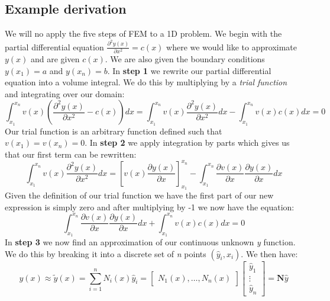 \subsection{Example derivation}
We will no apply the five steps of FEM to a 1D problem. We begin with the partial differential equation $\frac{\partial^2 y(x)}{\partial x^2} = c(x)$ where we would like to approximate $y(x)$ and are given $c(x)$. We are also given the boundary conditions $y(x_1) = a$ and $y(x_n) = b$. In \textbf{step 1} we rewrite our partial differential equation into a volume integral. We do this by multiplying by a \textit{trial function} and integrating over our domain:
\begin{equation*}
	\int_{x_1}^{x_n} v(x)\left(\frac{\partial^2 y(x)}{\partial x^2} - c(x)\right)dx = \int_{x_1}^{x_n} v(x)\frac{\partial^2 y(x)}{\partial x^2} dx - \int_{x_1}^{x_n} v(x)c(x) dx = 0
\end{equation*}
Our trial function is an arbitrary function defined such that $v(x_1) = v(x_n) = 0$. In \textbf{step 2} we apply integration by parts which gives us that our first term can be rewritten:
\begin{equation*}
	\int_{x_1}^{x_n} v(x)\frac{\partial^2 y(x)}{\partial x^2} dx = \left[v(x)\frac{\partial y(x)}{\partial x}\right]_{x_1}^{x_n} - \int_{x_1}^{x_n} \frac{\partial v(x)}{\partial x}\frac{\partial y(x)}{\partial x} dx
\end{equation*}
Given the definition of our trial function we have the first part of our new expression is simply zero and after multiplying by -1 we now have the equation:
\begin{equation*}
	\int_{x_1}^{x_n} \frac{\partial v(x)}{\partial x}\frac{\partial y(x)}{\partial x} dx + \int_{x_1}^{x_n} v(x)c(x) dx = 0
\end{equation*}
In \textbf{step 3} we now find an approximation of our continuous unknown \textit{y} function. We do this by breaking it into a discrete set of \textit{n} points $(\hat{y}_i, x_i)$. We then have:
\begin{equation*}
	y(x) \approx \tilde{y}(x) = \sum_{i=1}^{n}N_i(x)\hat{y}_i = \begin{bmatrix}
		N_1(x),\dots,N_n(x)
	\end{bmatrix}\begin{bmatrix}
	\hat{y}_1\\
	\vdots\\
	\hat{y}_n
\end{bmatrix} = \mathbf{N}\hat{y}
\end{equation*}
